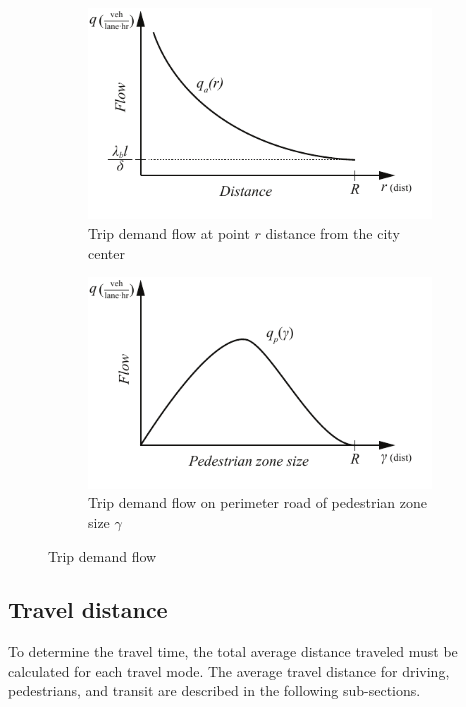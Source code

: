 \documentclass{elsarticle}\usepackage[]{graphicx}\usepackage[]{color}
\begin{document}
\begin{figure}[H]
     \centering
     \hfill
     \begin{subfigure}[b]{0.45\textwidth}
         \centering
         \includegraphics[width=\textwidth]{diagram_flow_across}
         \caption{Trip demand flow at point $r$ distance from the city center}
         \label{fig:flowacross}
     \end{subfigure}
     \hfill
     \begin{subfigure}[b]{0.45\textwidth}
         \centering
         \includegraphics[width=\textwidth]{diagram_flow_perim}
         \caption{Trip demand flow on perimeter road of pedestrian zone size $\gamma$}
         \label{fig:perimflow}
     \end{subfigure}
     \hfill
     \caption{Trip demand flow}
\end{figure}

\subsection{Travel distance}
To determine the travel time, the total average distance traveled must be calculated for each travel mode. The average travel distance for driving, pedestrians, and transit are described in the following sub-sections.
\end{document}
